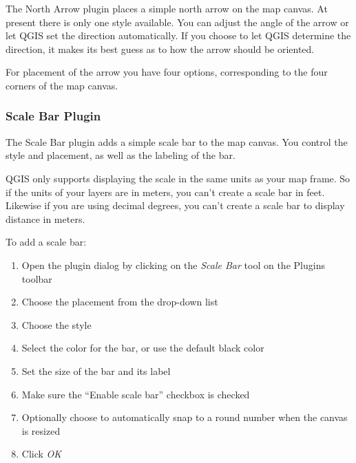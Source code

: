 The North Arrow plugin places a simple north arrow on the map canvas. At
present there is only one style available. You can adjust the angle of the
arrow or let QGIS set the direction automatically. If you choose to let
QGIS determine the direction, it makes its best guess as to how the arrow
should be oriented.

For placement of the arrow you have four options, corresponding to the four 
corners of the map canvas.


\subsubsection{Scale Bar Plugin}
The Scale Bar plugin adds a simple scale bar to the map canvas. You
control the style and placement, as well as the labeling of the bar. 

QGIS only supports displaying the scale in the same units as your map frame. So
if the units of your layers are in meters, you can't create a scale bar in
feet. Likewise if you are using decimal degrees, you can't create a scale
bar to display distance in meters.

To add a scale bar:

\begin{enumerate}
\item Open the plugin dialog by clicking on the \textsl{Scale Bar} tool
  on the Plugins toolbar
\item Choose the placement from the drop-down list
\item Choose the style
\item Select the color for the bar, or use the default black color
\item Set the size of the bar and its label
\item Make sure the ``Enable scale bar'' checkbox is checked
\item Optionally choose to automatically snap to a round number when the
  canvas is resized
\item Click \textsl{OK} 
\end{enumerate} 


